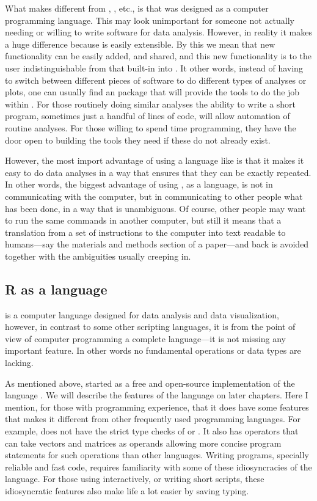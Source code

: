 \documentclass[krantz2]{krantz}\usepackage{knitr}%
\begin{document}
What makes \Rlang different from , , etc., is that \Slang was designed as a computer programming language. This may look unimportant for someone not actually needing or willing to write software for data analysis. However, in reality it makes a huge difference because \Rlang is easily extensible. By this we mean that new functionality can be easily added, and shared, and this new functionality is to the user indistinguishable from that built-in into \Rlang. It other words, instead of having to switch between different pieces of software to do different types of analyses or plots, one can usually find an \Rlang package that will provide the tools to do the job within \Rlang. For those routinely doing similar analyses the ability to write a short program, sometimes just a handful of lines of code, will allow automation of routine analyses. For those willing to spend time programming, they have the door open to building the tools they need if these do not already exist.

However, the most import advantage of using a language like \Rlang is that it makes it easy to do data analyses in a way that ensures that they can be exactly repeated. In other words, the biggest advantage of using \Rlang, as a language, is not in communicating with the computer, but in communicating to other people what has been done, in a way that is unambiguous. Of course, other people may want to run the same commands in another computer, but still it means that a translation from a set of instructions to the computer into text readable to humans---say the materials and methods section of a paper---and back is avoided together with the ambiguities usually creeping in.

\subsection{R as a language}
\Rlang is a computer language designed for data analysis and data visualization, however, in contrast to some other scripting languages, it is from the point of view of computer programming a complete language---it is not missing any important feature. In other words no fundamental operations or data types are lacking.

As mentioned above, \Rlang started as a free and open-source implementation of the \Slang language \autocite{Becker1984,Becker1988}. We will describe the features of the \Rlang language on later chapters. Here I mention, for those with programming experience, that it does have some features that makes it different from other frequently used programming languages. For example, \Rlang does not have the strict type checks of  or  \Cpplang. It also has operators that can take vectors and matrices as operands allowing more concise program statements for such operations than other languages. Writing programs, specially reliable and fast code, requires familiarity with some of these idiosyncracies of the \Rlang language. For those using \Rpgrm interactively, or writing short scripts, these idiosyncratic features also make life a lot easier by saving typing.
\end{document}
